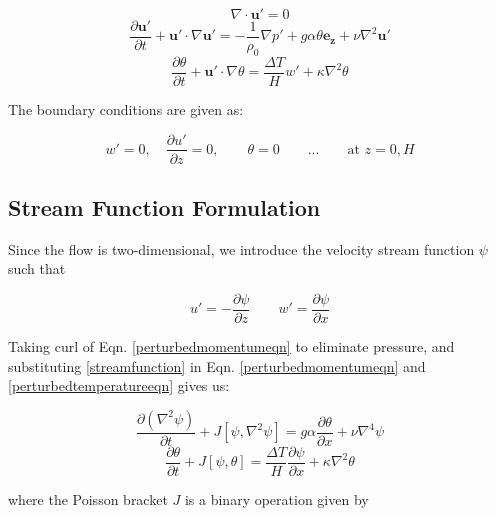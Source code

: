 \documentclass[paper=a4, fontsize=11pt]{scrartcl}
\numberwithin{equation}{section}		%
\numberwithin{figure}{section}			%
\numberwithin{table}{section}				%
\begin{document}
\begin{equation}
	\nabla \cdot \mathbf{u'} = 0
	\label{perturbedcontinuityeqn}
\end{equation}
\begin{equation}
	\frac{\partial \mathbf{u'}}{\partial t} + \mathbf{u'} \cdot \nabla \mathbf{u'} = - \frac{1}{\rho_0} \nabla p' + g\alpha\theta \mathbf{e_z} + \nu \nabla^2 \mathbf{u'} 
	\label{perturbedmomentumeqn}
\end{equation}
\begin{equation}
	\frac{\partial \theta}{\partial t} + \mathbf{u'} \cdot \nabla \theta = \frac{\Delta T}{H} w' + \kappa \nabla^2 \theta 
	\label{perturbedtemperatureeqn}
\end{equation}

\noindent The boundary conditions are given as:

\begin{equation}
	w' = 0, \quad \frac{\partial u'}{\partial z} = 0, \qquad \theta = 0 \qquad ... \qquad \text{at } z = 0, H
\end{equation}


\subsection{Stream Function Formulation}
Since the flow is two-dimensional, we introduce the velocity stream function $\psi$ such that 

\begin{equation}
	u' = -\frac{\partial \psi}{\partial z} \qquad w' = \frac{\partial \psi}{\partial x}
	\label{streamfunction}
\end{equation}

Taking curl of Eqn. \ref{perturbedmomentumeqn} to eliminate pressure, and substituting \ref{streamfunction} in Eqn. \ref{perturbedmomentumeqn} and \ref{perturbedtemperatureeqn} gives us:

\begin{equation}
	\frac{\partial (\nabla^2 \psi)}{\partial t} + J[\psi, \nabla^2 \psi] = g\alpha \frac{\partial \theta}{\partial x} + \nu \nabla^4 \psi
	\label{streamfunctioneqn}
\end{equation}	 
\begin{equation}
	\frac{\partial \theta}{\partial t} + J[\psi, \theta] = \frac{\Delta T}{H} \frac{\partial\psi}{\partial x} + \kappa \nabla^2 \theta 
	\label{streamfunctiontemperatureeqn}
\end{equation}

\noindent where the Poisson bracket $J$ is a binary operation given by
\end{document}
